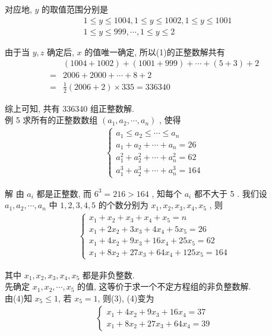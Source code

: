 对应地, $y$ 的取值范围分别是\begin{align}
	 & 1 \leqslant y \leqslant 1004,1 \leqslant y \leqslant 1002,1 \leqslant y \leqslant 1001 \\
	 & 1 \leqslant y \leqslant 999, \cdots, 1 \leqslant y \leqslant 2
\end{align}

由于当 $y ,  z$ 确定后,  $x$ 的值唯一确定, 所以(1)的正整数解共有\begin{align}
	  & (1004+1002)+(1001+999)+\cdots+(5+3)+2 \\
	= & 2006+2000+\cdots+8+2                  \\
	= & \frac{1}{2}(2006+2) \times 335=336340
\end{align}

综上可知, 共有 336340 组正整数解. \\
例 5 求所有的正整数数组 $\left(a_{1}, a_{2}, \cdots, a_{n}\right)$ , 使得
\begin{align*}
	\left\{\begin{array}{l}
		       a_{1} \leqslant a_{2} \leqslant \cdots \leqslant a_{n} \\
		       a_{1}+a_{2}+\cdots+a_{n}=26                            \\
		       a_{1}^{2}+a_{2}^{2}+\cdots+a_{n}^{2}=62                \\
		       a_{1}^{3}+a_{2}^{3}+\cdots+a_{n}^{3}=164
	       \end{array}\right.
\end{align*}

解 由 $a_{i}$ 都是正整数, 而 $6^{3}=216>164$ , 知每个 $a_{i}$ 都不大于 5 . 我们设 $a_{1}, a_{2}, \cdots, a_{n}$ 中 $1,2,3,4,5$ 的个数分别为 $x_{1}, x_{2}, x_{3}, x_{4}, x_{5}$ , 则
\begin{align*}
	\left\{\begin{array}{l}
		       x_{1}+x_{2}+x_{3}+x_{4}+x_{5}=n            \\
		       x_{1}+2 x_{2}+3 x_{3}+4 x_{4}+5 x_{5}=26   \\
		       x_{1}+4 x_{2}+9 x_{3}+16 x_{4}+25 x_{5}=62 \\
		       x_{1}+8 x_{2}+27 x_{3}+64 x_{4}+125 x_{5}=164
	       \end{array}\right.
\end{align*}

其中 $x_{1}, x_{2}, x_{3}, x_{4}, x_{5}$ 都是非负整数.\\
先确定 $x_{1}, x_{2}, \cdots, x_{5}$ 的值, 这等价于求一个不定方程组的非负整数解. \\
由(4)知 $x_{5} \leqslant 1$, 若 $x_{5}=1$, 则(3), (4)变为
\begin{align*}
	\left\{\begin{array}{l}
		       x_{1}+4 x_{2}+9 x_{3}+16 x_{4}=37 \\
		       x_{1}+8 x_{2}+27 x_{3}+64 x_{4}=39
	       \end{array}\right.
\end{align*}

